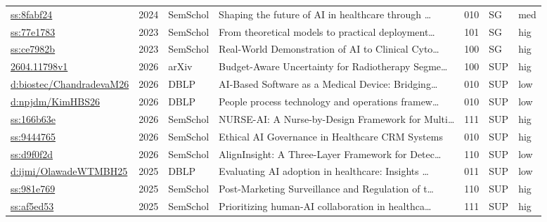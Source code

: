 \begin{table}[p]
\begin{tabularx}{\linewidth}{p{2.2cm} c p{1.4cm} X c p{1cm} p{0.7cm}}
  \href{https://www.semanticscholar.org/paper/8fabf24a07f006bd2097584770afd3953aadc4a6}{ss:8fabf24} & 2024 & SemSchol & Shaping the future of AI in healthcare through \ldots & 010 & SG & med \\
  \href{https://www.semanticscholar.org/paper/77e17832bbafda1dba494e03b00e82b22f7de7c0}{ss:77e1783} & 2023 & SemSchol & From theoretical models to practical deployment\ldots & 101 & SG & hig \\
  \href{https://www.semanticscholar.org/paper/ce7982b45f386e107507c1d30ef2288bbdd55ec8}{ss:ce7982b} & 2023 & SemSchol & Real-World Demonstration of AI to Clinical Cyto\ldots & 100 & SG & hig \\
  \href{https://arxiv.org/abs/2604.11798}{2604.11798v1} & 2026 & arXiv & Budget-Aware Uncertainty for Radiotherapy Segme\ldots & 100 & SUP & hig \\
  \href{https://dblp.org/rec/conf/biostec/ChandradevaM26}{d:biostec/ChandradevaM26} & 2026 & DBLP & AI-Based Software as a Medical Device: Bridging\ldots & 010 & SUP & low \\
  \href{https://dblp.org/rec/journals/npjdm/KimHBS26}{d:npjdm/KimHBS26} & 2026 & DBLP & People process technology and operations framew\ldots & 010 & SUP & low \\
  \href{https://www.semanticscholar.org/paper/166b63e88e64f56e7277c42c093fcf32748a4da5}{ss:166b63e} & 2026 & SemSchol & NURSE-AI: A Nurse-by-Design Framework for Multi\ldots & 111 & SUP & hig \\
  \href{https://www.semanticscholar.org/paper/94447651cc7a0d032fd9d08377ba46abcdea125e}{ss:9444765} & 2026 & SemSchol & Ethical AI Governance in Healthcare CRM Systems & 010 & SUP & hig \\
  \href{https://www.semanticscholar.org/paper/d9f0f2dafd5e976137c0037720665dbd936157f6}{ss:d9f0f2d} & 2026 & SemSchol & AlignInsight: A Three-Layer Framework for Detec\ldots & 110 & SUP & low \\
  \href{https://dblp.org/rec/journals/ijmi/OlawadeWTMBH25}{d:ijmi/OlawadeWTMBH25} & 2025 & DBLP & Evaluating AI adoption in healthcare: Insights \ldots & 011 & SUP & low \\
  \href{https://www.semanticscholar.org/paper/981e7694a91e9af418a2483724f5a4cbba904864}{ss:981e769} & 2025 & SemSchol & Post-Marketing Surveillance and Regulation of t\ldots & 110 & SUP & hig \\
  \href{https://www.semanticscholar.org/paper/af5ed5354bf871ea35c607fd37adabddb9686cef}{ss:af5ed53} & 2025 & SemSchol & Prioritizing human-AI collaboration in healthca\ldots & 111 & SUP & hig \\

\end{tabularx}
\end{table}
